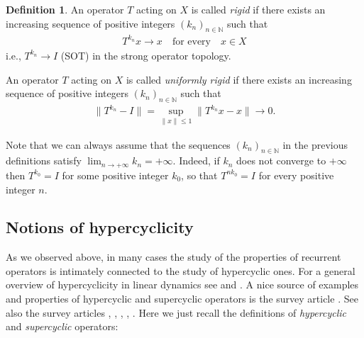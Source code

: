 \documentclass[12pt,leqno]{amsart}
\theoremstyle{plain}
\theoremstyle{definition}
\newtheorem{definition}[equation]{Definition}
\numberwithin{equation}{section}
\begin{document}
\begin{definition}
	An operator $T$ acting on $X$ is called \emph{rigid} if there exists an increasing sequence of positive integers $(k_n)_{n\in\mathbb N}$ such that 
	\begin{align*}
		T^{k_n}x\to x \quad \text{for every} \quad x\in X 
	\end{align*}
	i.e., $T^{k_n}\to I$ (SOT) in the strong operator topology.
	
	An operator $T$ acting on $X$ is called \emph{uniformly rigid} if there exists an increasing sequence of positive integers $(k_n)_{n\in\mathbb N}$ such that 
	\begin{align*}
		\| T^{k_n}-I\| =\sup_{\| x\| \leq 1}\| T^{k_n}x-x\| \to 0. 
	\end{align*}
\end{definition}
Note that we can always assume that the sequences $(k_n)_{n\in\mathbb N}$ in the previous definitions satisfy $\lim_{n\to+\infty} k_n=+\infty$. Indeed, if $k_n$ does not converge to $+\infty$ then $T^{k_0}=I$ for some positive integer $k_0$, so that $T^{nk_0}=I$ for every positive integer $n$.

\subsection*{Notions of hypercyclicity} As we observed above, in many cases the study of the properties of recurrent operators is intimately connected to the study of hypercyclic ones. For a general overview of hypercyclicity in linear dynamics see \cite{BM} and \cite{GrossePeris}. A nice source of examples and properties of hypercyclic and supercyclic operators is the survey article \cite{GE}. See also the survey articles \cite{GE2}, \cite{MoSa2}, \cite{BoMaPe}, \cite{Fe3}, \cite{GE3}.
Here we just recall the definitions of \emph{hypercyclic} and \emph{supercyclic} operators:
\end{document}
